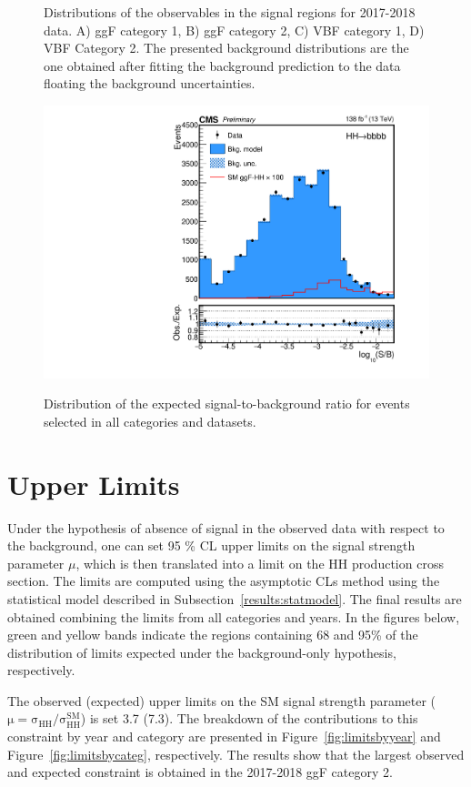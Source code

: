 \begin{figure}[htbp!]
\begin{center}
\end{center}
\caption[Distributions of the observables in the analysis signal regions for the 2017-2018 data]{Distributions of the observables in the signal regions for 2017-2018 data. A) ggF category 1, B) ggF category 2, C) VBF category 1, D) VBF Category 2. The presented background distributions are the one obtained after fitting the background prediction to the data floating the background uncertainties.}
\label{fig:bkgobservablesanatest20172018}
\end{figure}

\clearpage
\begin{figure}[ht!]
\centering
{\includegraphics[width=0.5\linewidth]{Figures/Results/additional/CMS-PAS-HIG-20-005_Figure-aux_014.pdf}}
\caption[Distribution of the expected signal-to-background ratio for events selected in all categories and datasets]{\label{fig:log10sb}
Distribution of the expected signal-to-background ratio for events selected in all categories and datasets.}
\end{figure}

\section{Upper Limits} \label{results:limits}
Under the hypothesis of absence of signal in the observed data with respect to the background, one can set  95 \% CL upper limits on the signal strength parameter $\mu$, which is then translated into a limit on the HH production cross section. The limits are computed using the asymptotic CLs method using the statistical model described in Subsection~\ref{results:statmodel}. The final results are obtained combining the limits from all categories and years. In the figures below, green and yellow bands indicate the regions containing 68 and 95\% of the distribution of limits expected under the background-only hypothesis, respectively.

The observed (expected) upper limits on the SM signal strength parameter ($\mathrm{\mu=\sigma_{HH}/\sigma_{HH}^{SM}}$) is set 3.7 (7.3). The breakdown of the contributions to this constraint by year and category are presented in Figure~\ref{fig:limitsbyyear} and Figure~\ref{fig:limitsbycateg}, respectively. The results show that the largest observed and expected constraint is obtained in the 2017-2018 ggF category 2.

